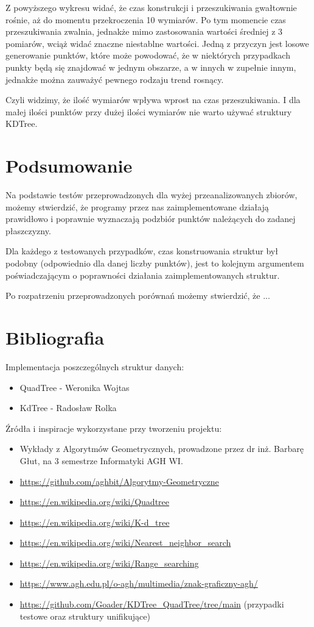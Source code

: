 \documentclass{lab}
\begin{document}
Z powyższego wykresu widać, że czas konstrukcji i przeszukiwania gwałtownie rośnie, aż do momentu przekroczenia 10 wymiarów.
Po tym momencie czas przeszukiwania zwalnia, jednakże mimo zastosowania wartości średniej z 3 pomiarów, wciąż widać znaczne niestablne wartości.
Jedną z przyczyn jest losowe generowanie punktów, które może powodować, że w niektórych przypadkach punkty będą się znajdować w jednym obszarze, a w innych w zupełnie innym, jednakże 
można zauważyć pewnego rodzaju trend rosnący. 

Czyli widzimy, że ilość wymiarów wpływa wprost na czas przeszukiwania. I dla małej ilości punktów przy
dużej ilości wymiarów nie warto używać struktury KDTree.

\section{Podsumowanie}
Na podstawie testów przeprowadzonych dla wyżej przeanalizowanych zbiorów, możemy
stwierdzić, że programy przez nas zaimplementowane działają prawidłowo i poprawnie wyznaczają podzbiór punktów należących do zadanej płaszczyzny. 

Dla każdego z testowanych przypadków, czas konstruowania struktur był podobny (odpowiednio dla danej liczby punktów), jest to kolejnym argumentem poświadczającym o poprawności działania zaimplementowanych struktur. 

Po rozpatrzeniu przeprowadzonych porównań możemy stwierdzić, że ...

\newpage
\section{Bibliografia}
Implementacja poszczególnych struktur danych:
\begin{itemize}
  \item QuadTree - Weronika Wojtas
  \item KdTree - Radosław Rolka
\end{itemize}

Źródła i inspiracje wykorzystane przy tworzeniu projektu:
\begin{itemize}
  \item Wykłady z Algorytmów Geometrycznych, prowadzone przez dr inż. Barbarę Głut, na 3 semestrze Informatyki AGH WI.
  \item \url{https://github.com/aghbit/Algorytmy-Geometryczne}
  \item \url{https://en.wikipedia.org/wiki/Quadtree}
  \item \url{https://en.wikipedia.org/wiki/K-d_tree}
  \item \url{https://en.wikipedia.org/wiki/Nearest_neighbor_search}
  \item \url{https://en.wikipedia.org/wiki/Range_searching}
  \item \url{https://www.agh.edu.pl/o-agh/multimedia/znak-graficzny-agh/}
  \item \url{https://github.com/Goader/KDTree_QuadTree/tree/main} (przypadki testowe oraz struktury unifikujące)
\end{itemize}
\end{document}
